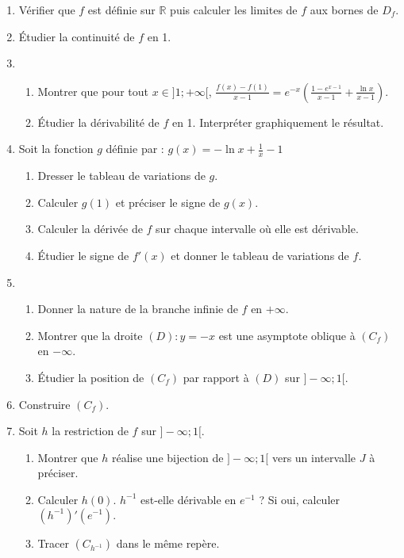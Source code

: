 \begin{enumerate}
    \item Vérifier que \( f \) est définie sur \( \mathbb{R} \) puis calculer les limites de \( f \) aux bornes de \( D_f \).
    \item Étudier la continuité de \( f \) en 1.
    \item
          \begin{enumerate}
              \item Montrer que pour tout \( x \in ]1;+\infty[ \),
                    \( \frac{f(x) - f(1)}{x - 1} = e^{-x} \left( \frac{1 - e^{x-1}}{x - 1} + \frac{\ln x}{x - 1} \right). \)
              \item Étudier la dérivabilité de \( f \) en 1. Interpréter graphiquement le résultat.
          \end{enumerate}
    \item Soit la fonction \( g \) définie par : \( g(x) = - \ln x + \frac{1}{x} - 1 \)
          \begin{enumerate}
              \item Dresser le tableau de variations de \( g \).
              \item Calculer \( g(1) \) et préciser le signe de \( g(x) \).
              \item Calculer la dérivée de \( f \) sur chaque intervalle où elle est dérivable.
              \item Étudier le signe de \( f'(x) \) et donner le tableau de variations de \( f \).
          \end{enumerate}
    \item
          \begin{enumerate}
              \item Donner la nature de la branche infinie de \( f \) en \( +\infty \).
              \item Montrer que la droite \( (D) : y = -x \) est une asymptote oblique à \( (C_f) \) en \( -\infty \).
              \item Étudier la position de \( (C_f) \) par rapport à \( (D) \) sur \( ]-\infty;1[ \).
          \end{enumerate}
    \item Construire \( (C_f) \).
    \item Soit \( h \) la restriction de \( f \) sur \( ]-\infty;1[ \).
          \begin{enumerate}
              \item Montrer que \( h \) réalise une bijection de \( ]-\infty;1[ \) vers un intervalle \( J \) à préciser.
              \item Calculer \( h(0) \).
                    \( h^{-1} \) est-elle dérivable en \( e^{-1} \) ? Si oui, calculer  \( (h^{-1})'(e^{-1}). \)
              \item Tracer \( (C_{h^{-1}}) \) dans le même repère.
          \end{enumerate}
\end{enumerate}

